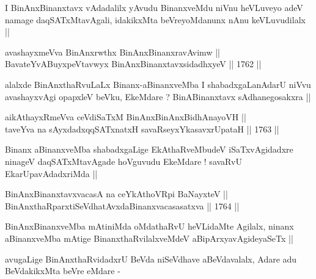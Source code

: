 \begin{artha}
I BinAnxBinanxtavx vAdadalilx yAvudu BinanxveMdu niVnu heVLuveyo adeV
namage daqSATxMtavAgali, idakikxMta beVreyoMdanunx nAnu keVLuvudilalx ||
\end{artha}


\begin{shl}
avashayxmeVva BinAnxrwthx BinAnxBinanxravAvimw || \\
BavateYvABuyxpeVtavwyx BinAnxBinanxtavxsidadhxyeV ||  1762 ||  
\end{shl}	

\begin{artha}
alalxde BinAnxthaRvuLaLx Binanx-aBinanxveMba I shabadxgaLanAdarU niVvu
avashayxvAgi opapxleV beVku, EkeMdare ? BinABinanxtavx sAdhanegosakxra ||
\end{artha}


\begin{shl}
aikAthayxRmeVva ceVdiSaTxM BinAnxBinAnxBidhAnayoVH ||  \\
taveYva na sAyxdadxqqSATxnatxH savaRseyxYkasavxrUpataH ||  1763 ||  
\end{shl}

\begin{artha}
Binanx aBinanxveMba shabadxgaLige EkAthaRveMbudeV iSaTxvAgidadxre
ninageV daqSATxMtavAgade hoVguvudu EkeMdare ! savaRvU
EkarUpavAdadxriMda ||
\end{artha}


\begin{shl}
BinAnxBinanxtavxvacasA na ceYkAthoVR\s pi BaNayxteV ||  \\
BinAnxthaRparxtiSeVdhatAvxdaBinanxvacasasatxva ||  1764 ||  
\end{shl}

\begin{artha}
BinAnxBinanxveMba mAtiniMda oMdathaRvU heVLidaMte Agilalx, ninanx
aBinanxveMba mAtige BinanxthaRvilalxveMdeV aBipArxyavAgideyaSeTx ||
\end{artha}

\begin{artha}
avugaLige BinAnxthaRvidadxrU BeVda niSeVdhave aBeVdavalalx, Adare adu
BeVdakikxMta beVre eMdare -
\end{artha}

